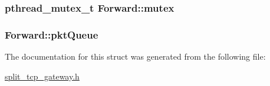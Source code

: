 \hypertarget{structForward_abb4b4581a071b8a44c708f853771d8ed}{
\subsubsection[{mutex}]{\setlength{\rightskip}{0pt plus 5cm}pthread\-\_\-mutex\-\_\-t {\bf \-Forward\-::mutex}}}\label{structForward_abb4b4581a071b8a44c708f853771d8ed}
\hypertarget{structForward_adbe26a18bde40343ed7c21e282debc08}{
\subsubsection[{pkt\-Queue}]{ {\bf \-Forward\-::pkt\-Queue}}}\label{structForward_adbe26a18bde40343ed7c21e282debc08}


\-The documentation for this struct was generated from the following file\-:\begin{DoxyCompactItemize}
\item 
\hyperlink{split__tcp__gateway_8h}{split\-\_\-tcp\-\_\-gateway.\-h}\end{DoxyCompactItemize}
